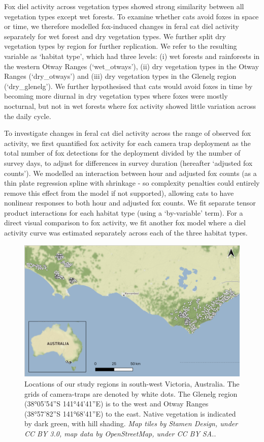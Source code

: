 \documentclass[preprint, 3p, authoryear]{elsarticle} %
\begin{document}
Fox diel activity across vegetation types showed strong similarity between all vegetation types except wet forests. To examine whether cats avoid foxes in space or time, we therefore modelled fox-induced changes in feral cat diel activity separately for wet forest and dry vegetation types. We further split dry vegetation types by region for further replication. We refer to the resulting variable as `habitat type', which had three levels: (i) wet forests and rainforests in the western Otway Ranges (`wet\_otways'), (ii) dry vegetation types in the Otway Ranges (`dry\_otways') and (iii) dry vegetation types in the Glenelg region (`dry\_glenelg'). We further hypothesised that cats would avoid foxes in time by becoming more diurnal in dry vegetation types where foxes were mostly nocturnal, but not in wet forests where fox activity showed little variation across the daily cycle.

To investigate changes in feral cat diel activity across the range of observed fox activity, we first quantified fox activity for each camera trap deployment as the total number of fox detections for the deployment divided by the number of survey days, to adjust for differences in survey duration (hereafter `adjusted fox counts'). We modelled an interaction between hour and adjusted fox counts (as a thin plate regression spline with shrinkage - so complexity penalties could entirely remove this effect from the model if not supported), allowing cats to have nonlinear responses to both hour and adjusted fox counts. We fit separate tensor product interactions for each habitat type (using a `by-variable' term). For a direct visual comparison to fox activity, we fit another fox model where a diel activity curve was estimated separately across each of the three habitat types.

\newpage



\begin{figure}

{\centering \includegraphics[width=0.8\linewidth]{../figs/map_cams} 

}

\caption{Locations of our study regions in south-west Victoria, Australia. The grids of camera-traps are denoted by white dots. The Glenelg region (38°05'54''S 141°44'41''E) is to the west and Otway Ranges (38°57'82''S 141°68'41''E) to the east. Native vegetation is indicated by dark green, with hill shading. \emph{Map tiles by Stamen Design, under CC BY 3.0, map data by OpenStreetMap, under CC BY SA.}.}\label{fig:diel-map}
\end{figure}
\end{document}
